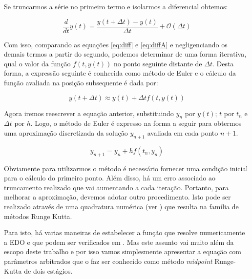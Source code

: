 \documentclass[
		12pt,            %
		a4paper
	      ]  
	      {article}          %
\begin{document}
	Se truncarmos a série no primeiro termo e isolarmos a diferencial obtemos:
	
	\vspace{-5mm}
	\begin{equation}\label{eq:diffA}
		\frac{d}{dt}y(t) = \frac{y(t + \Delta t)- y(t)}{\Delta t} + \mathcal{O}(\Delta t)
	\end{equation}
	\vspace{-7mm}
	
	Com isso, comparando as equações \ref{eq:diff} e \ref{eq:diffA} e negligenciando 
	os demais termos a partir do segundo, podemos determinar de uma forma iterativa, qual o valor da função 
	$f\left ( t,y(t) \right )$ no ponto seguinte distante de $\Delta t$. Desta forma, a expressão 
	seguinte é conhecida como método de Euler e o cálculo da função avaliada na posição subsequente 
	é dada por:
	
	\vspace{-5mm}
	\begin{equation}
		y(t + \Delta t) \approx y(t) + \Delta t f \left ( t, y \left ( t \right ) \right )
	\end{equation}
	\vspace{-7mm}
	
	Agora iremos reescrever a equação anterior, substituindo $y_n$ por $y(t)$; $t$ por $t_n$ e 
	$\Delta t$ por $h$. Logo, o método de Euler é expresso na forma a seguir para obtermos uma 
	aproximação discretizada da solução $y_{n+1}$ avaliada em cada ponto $n + 1$.

	\vspace{-5mm}
	\begin{equation}\label{eq:euler}
		y_{n+1} = y_n + h f \left ( t_n, y_n \right ) 
	\end{equation}
	\vspace{-7mm}

	Obviamente para utilizarmos o método é necessário fornecer uma condição inicial para o cálculo 
	do primeiro ponto. Além disso, há um erro associado ao truncamento realizado que vai aumentando
	a cada iteração. Portanto, para melhorar a aproximação, devemos adotar outro procedimento. Isto 
	pode ser realizado através de uma quadratura numérica (ver \cite{NASA1967, Chapman2010C6}) que 
	resulta na família de métodos Runge Kutta.\par
	
	Para isto, há varias maneiras de estabelecer a função que resolve numericamente a EDO e que podem 
	ser verificados em \cite{NASA1967,Chapman2010C7, Hairer1989}. Mas este assunto vai muito além da 
	escopo deste trabalho e por isso vamos simplesmente apresentar a equação com parâmetros arbitrados 
	que o faz ser conhecido como método {\it midpoint} Runge-Kutta de dois estágios.
\end{document}
